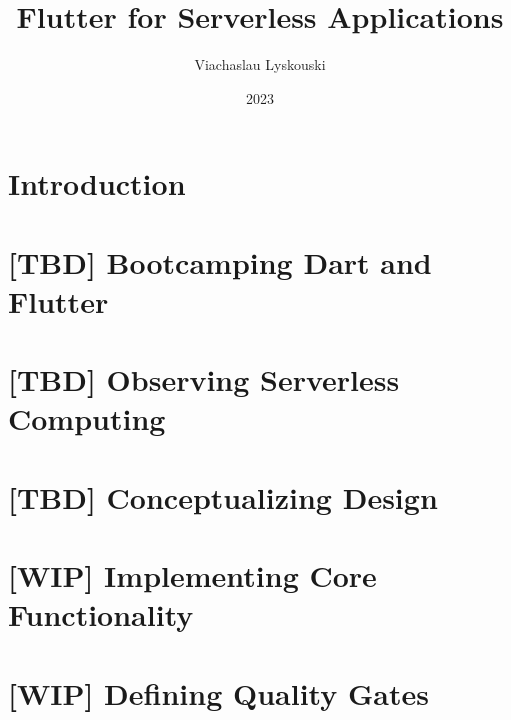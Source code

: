 \documentclass[12pt, a4paper, twoside]{extreport}
\author{Viachaslau Lyskouski}
\title{Flutter for Serverless Applications}
\date{2023}
\begin{document}


\maketitle

%

\tableofcontents



\section*{Introduction}


\newpage
\section{[TBD] Bootcamping Dart and Flutter}


\newpage
\section{[TBD] Observing Serverless Computing}


\newpage
\section{[TBD] Conceptualizing Design}


\newpage
\section{[WIP] Implementing Core Functionality}



\newpage
\section{[WIP] Defining Quality Gates}





\end{document}
